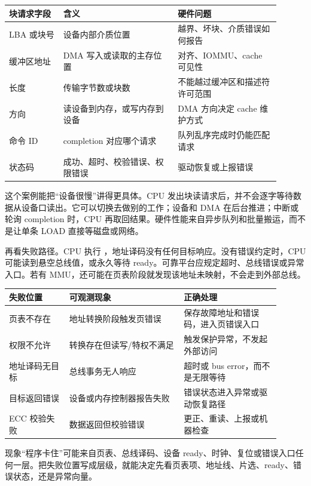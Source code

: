 \begin{longtable}{L{0.18\linewidth}L{0.38\linewidth}L{0.34\linewidth}}
\toprule
块请求字段 & 含义 & 硬件问题 \\
\midrule
LBA 或块号 & 设备内部介质位置 & 越界、坏块、介质错误如何报告 \\\tablerowrule
缓冲区地址 & DMA 写入或读取的主存位置 & 对齐、IOMMU、cache 可见性 \\\tablerowrule
长度 & 传输字节数或块数 & 不能越过缓冲区和描述符许可范围 \\\tablerowrule
方向 & 读设备到内存，或写内存到设备 & DMA 方向决定 cache 维护方式 \\\tablerowrule
命令 ID & completion 对应哪个请求 & 队列乱序完成时仍能匹配请求 \\\tablerowrule
状态码 & 成功、超时、校验错误、权限错误 & 驱动恢复或上报错误 \\
\bottomrule
\end{longtable}

这个案例能把“设备很慢”讲得更具体。CPU 发出块读请求后，并不会逐字等待数据从设备口读出。它可以切换去做别的工作；设备和 DMA 在后台推进；中断或轮询 completion 时，CPU 再取回结果。硬件性能来自异步队列和批量搬运，而不是让单条 LOAD 直接等磁盘或网络。

再看失败路径。CPU 执行 ，地址译码没有任何目标响应。没有错误约定时，CPU 可能读到悬空总线值，或永久等待 ready。可靠平台应规定超时、总线错误或异常入口。若有 MMU，还可能在页表阶段就发现该地址未映射，不会走到外部总线。

\begin{longtable}{L{0.2\linewidth}L{0.38\linewidth}L{0.32\linewidth}}
\toprule
失败位置 & 可观测现象 & 正确处理 \\
\midrule
页表不存在 & 地址转换阶段触发页错误 & 保存故障地址和错误码，进入页错误入口 \\\tablerowrule
权限不允许 & 转换存在但读写/特权不满足 & 触发保护异常，不发起外部访问 \\\tablerowrule
地址译码无目标 & 总线事务无人响应 & 超时或 bus error，而不是无限等待 \\\tablerowrule
目标返回错误 & 设备或内存控制器报告失败 & 错误状态进入异常或驱动恢复路径 \\\tablerowrule
ECC 校验失败 & 数据返回但校验错误 & 更正、重读、上报或机器检查 \\
\bottomrule
\end{longtable}

现象“程序卡住”可能来自页表、总线译码、设备 ready、时钟、复位或错误入口任何一层。把失败位置写成层级，就能决定先看页表项、地址线、片选、ready、错误状态，还是异常向量。

